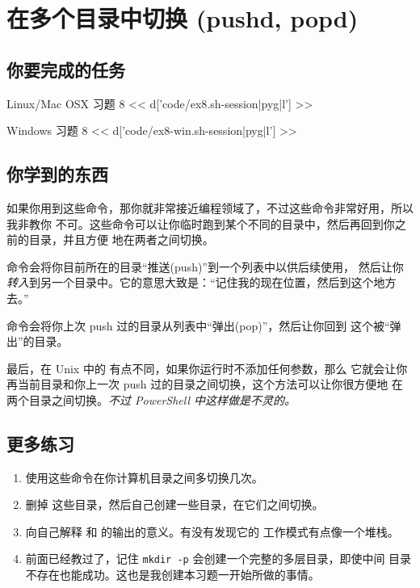 \chapter{在多个目录中切换 (pushd, popd)}

\section{你要完成的任务}

\begin{code}{Linux/Mac OSX 习题 8}
<< d['code/ex8.sh-session|pyg|l'] >>
\end{code}

\begin{code}{Windows 习题 8}
<< d['code/ex8-win.sh-session|pyg|l'] >>
\end{code}

\section{你学到的东西}

如果你用到这些命令，那你就非常接近编程领域了，不过这些命令非常好用，所以我非教你
不可。这些命令可以让你临时跑到某个不同的目录中，然后再回到你之前的目录，并且方便
地在两者之间切换。

 命令会将你目前所在的目录“推送(push)”到一个列表中以供后续使用，
然后让你\emph{转入}到另一个目录中。它的意思大致是：“记住我的现在位置，然后到这个地方去。”

 命令会将你上次 push 过的目录从列表中“弹出(pop)”，然后让你回到
这个被“弹出”的目录。

最后，在 Unix 中的  有点不同，如果你运行时不添加任何参数，那么
它就会让你再当前目录和你上一次 push 过的目录之间切换，这个方法可以让你很方便地
在两个目录之间切换。\emph{不过 PowerShell 中这样做是不灵的。}


\section{更多练习}

\begin{enumerate}
\item 使用这些命令在你计算机目录之间多切换几次。
\item 删掉  这些目录，然后自己创建一些目录，在它们之间切换。
\item 向自己解释  和  的输出的意义。有没有发现它的
    工作模式有点像一个堆栈。
\item 前面已经教过了，记住 \verb|mkdir -p| 会创建一个完整的多层目录，即使中间
    目录不存在也能成功。这也是我创建本习题一开始所做的事情。
\end{enumerate}

